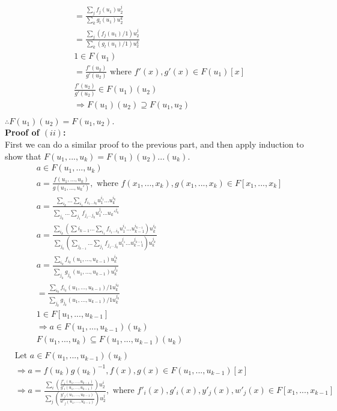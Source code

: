 \documentclass[11pt]{article}
\begin{document}
{\begin{align*}
& = \frac{\sum_{j} f_j(u_1) u_2^j }{\sum_{k} g_l(u_1) u_2^k}\\
& = \frac{\sum_{j} (f_j(u_1)/1) u_2^j }{\sum_{k} (g_l(u_1)/1) u_2^k}\\
&\text{$1 \in F(u_1)$}\\
& = \frac{f'(u_2)}{g'(u_2)} \text{ where $f'(x), g'(x ) \in F(u_1)[x]$}\\
&\frac{f'(u_2)}{g'(u_2)} \in F(u_1)(u_2)\\
&\Rightarrow F(u_1)(u_2) \supseteq F(u_1, u_2)\\
\end{align*}
$ \therefore F(u_1)(u_2) = F(u_1, u_2)$.\\
\textbf{Proof of $(ii)$:}\\
First we can do a similar proof to the previous part, and then apply induction to show that $F(u_1, ..., u_k) = F(u_1)(u_2)...(u_k)$.
\begin{align*}
&a \in F(u_1, ..., u_k)\\
&a = \frac{f(u_1, ..., u_k)}{g(u_1, ..., u_k')}, \text{ where $f(x_1, ..., x_k), g(x_1, ..., x_k) \in F[x_1, ..., x_k]$}\\
&a = \frac{\sum_{i_k} ... \sum_{i_1}f_{i_1 ... i_k}u_1^{i_1}...u_k^{i_k}}{\sum_{j_k} ... \sum_{j_1}f_{j_1 ... j_k}u_1^{j_1}...u_k'^{j_k}}\\
&a = \frac{\sum_{i_k} \left( \sum{i_{k-1}}... \sum_{i_1}f_{i_1 ... i_k}u_1^{i_1}...u_{k-1}^{i_{k-1}} \right) u_k^{i_k}}{\sum_{j_k} \left( \sum_{j_{k-1}}... \sum_{j_1}f_{j_1 ... j_k}u_1^{j_1}...u_{k-1}^{j_{k-1}} \right) u_k^{j_k}}\\
&a = \frac{\sum_{i_k} f_{i_k}(u_1, ..., u_{k-1}) u_k^{i_k}}{\sum_{j_k} g_{j_k}(u_1, ..., u_{k-1}) u_k^{j_k}}\\
& = \frac{\sum_{i_k} f_{i_k}(u_1, ..., u_{k-1})/1 u_k^{i_k}}{\sum_{j_k} g_{j_k}(u_1, ..., u_{k-1})/1 u_k^{j_k}}\\
&1 \in F[u_1, ..., u_{k-1}]\\
&\Rightarrow a \in F(u_1, ..., u_{k-1})(u_k)\\
&F(u_1, ..., u_k) \subseteq F(u_1, ..., u_{k-1})(u_k)\\
\end{align*}
\begin{align*}
&\text{Let }a \in F(u_1, ..., u_{k-1})(u_k)\\
&\Rightarrow a = f(u_k)g(u_k)^{-1}, f(x), g(x) \in F(u_1, ..., u_{k-1})[x]\\
&\Rightarrow a = \frac{\sum_i \left( \frac{f'_i(u_1, ..., u_{k-1})}{g'_i(u_1, ..., u_{k-1})} \right) u_2^i}{ \sum_j \left( \frac{y'_j(u_1, ..., u_{k-1})}{w'_j(u_1, ..., u_{k-1})} \right) u_2^j}, \text{ where }f'_i(x), g'_i(x), y'_j(x), w'_j(x) \in F[x_1, ..., x_{k-1}]\\

\end{align*}}
\end{document}
